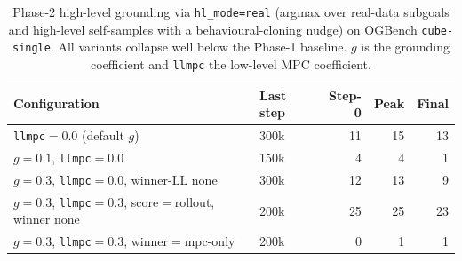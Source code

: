 \begin{table}[h]
\centering
\caption{Phase-2 high-level grounding via \texttt{hl\_mode=real}
(argmax over real-data subgoals and high-level self-samples with a
behavioural-cloning nudge) on OGBench \texttt{cube-single}. All variants
collapse well below the Phase-1 baseline. $g$ is the grounding
coefficient and \texttt{llmpc} the low-level MPC coefficient.}
\label{tab:app-lsp-real}
\begin{tabular}{llrrr}
\toprule
Configuration & Last step & Step-0 & Peak & Final \\
\midrule
\texttt{llmpc}$=0.0$ (default $g$)                              & 300k & 11 & 15 & 13 \\
$g{=}0.1$, \texttt{llmpc}$=0.0$                                 & 150k & 4  & 4  & 1 \\
$g{=}0.3$, \texttt{llmpc}$=0.0$, winner-LL none                 & 300k & 12 & 13 & 9 \\
$g{=}0.3$, \texttt{llmpc}$=0.3$, score$=$rollout, winner none   & 200k & 25 & 25 & 23 \\
$g{=}0.3$, \texttt{llmpc}$=0.3$, winner$=$mpc-only              & 200k & 0  & 1  & 1 \\
\bottomrule
\end{tabular}
\end{table}


